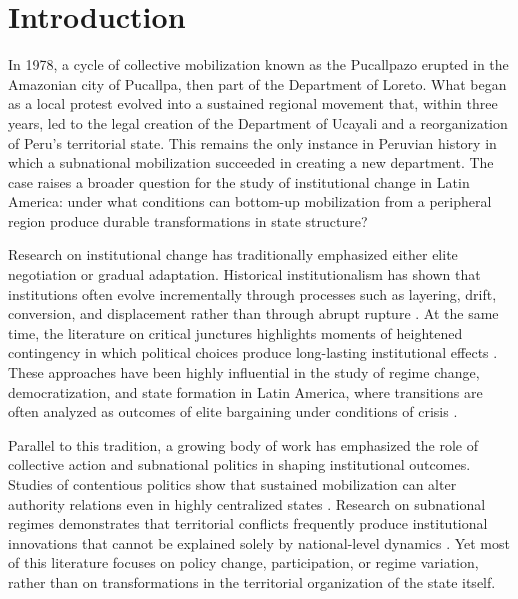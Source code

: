 \documentclass[12pt]{article}
\begin{document}
\newpage

\section{Introduction}

In 1978, a cycle of collective mobilization known as the Pucallpazo
erupted in the Amazonian city of Pucallpa, then part of the Department
of Loreto. What began as a local protest evolved into a sustained
regional movement that, within three years, led to the legal creation
of the Department of Ucayali and a reorganization of Peru's territorial
state. This remains the only instance in Peruvian history in which a
subnational mobilization succeeded in creating a new department. The
case raises a broader question for the study of institutional change in
Latin America: under what conditions can bottom-up mobilization from a
peripheral region produce durable transformations in state structure?

Research on institutional change has traditionally emphasized either
elite negotiation or gradual adaptation. Historical institutionalism
has shown that institutions often evolve incrementally through processes
such as layering, drift, conversion, and displacement rather than through
abrupt rupture \autocite{mahoney_explaining_2010,streeck_introduction_2005}. At the
same time, the literature on critical junctures highlights moments of
heightened contingency in which political choices produce long-lasting
institutional effects \autocite{collier_shaping_1991,capoccia_study_2007}.
These approaches have been highly influential in the study of regime
change, democratization, and state formation in Latin America, where
transitions are often analyzed as outcomes of elite bargaining under
conditions of crisis \autocite{huntington_tercera_2002,odonnell_transitions_1986}.

Parallel to this tradition, a growing body of work has emphasized the
role of collective action and subnational politics in shaping
institutional outcomes. Studies of contentious politics show that
sustained mobilization can alter authority relations even in highly
centralized states \autocite{tilly_social_2004,abers_inventing_2000}. Research on
subnational regimes demonstrates that territorial conflicts frequently
produce institutional innovations that cannot be explained solely by
national-level dynamics \autocite{gibson_boundary_2005,giraudy_politics_2010}. Yet most of
this literature focuses on policy change, participation, or regime
variation, rather than on transformations in the territorial
organization of the state itself.
\end{document}
